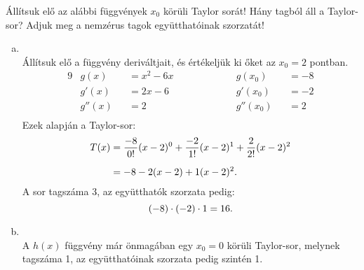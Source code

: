 \documentclass[exercise]{math-standalone}
\begin{document}
\begin{exercise}{%
    Állítsuk elő az alábbi függvények $x_0$ körüli Taylor sorát!
    Hány tagból áll a Taylor-sor? Adjuk meg a nemzérus tagok együtthatóinak
    szorzatát!
  }
{\begin{enumerate}[a)]
      \item {}\\[3mm]
            Állítsuk elő a függvény deriváltjait, és értékeljük ki őket az
            $x_0 = 2$ pontban.
            \begin{alignat*}{9}
               & g(x)   &  & = x^2 - 6x \hspace{2cm} &  & g(x_0)   &  & = -8 \\
               & g'(x)  &  & = 2x - 6 \hspace{2cm}   &  & g'(x_0)  &  & = -2 \\
               & g''(x) &  & = 2 \hspace{2cm}        &  & g''(x_0) &  & = 2  \\
            \end{alignat*}
            Ezek alapján a Taylor-sor:
            \begin{align*}
              T(x)
               & = \frac{-8}{0!}(x - 2)^0
              + \frac{-2}{1!}(x - 2)^1
              + \frac{2}{2!}(x - 2)^2
              \\[2mm]
               & = -8
              - 2(x - 2)
              + 1(x - 2)^2
              \text.
            \end{align*}
            A sor tagszáma 3, az együtthatók szorzata pedig:
            \[
              (-8) \cdot (-2) \cdot 1 = 16
              \text.
            \]

      \item {}\\[3mm]
            A $h(x)$ függvény már önmagában egy $x_0 = 0$ körüli Taylor-sor,
            melynek tagszáma 1, az együtthatóinak szorzata pedig szintén 1.
    \end{enumerate}
  }
\end{exercise}
\end{document}
